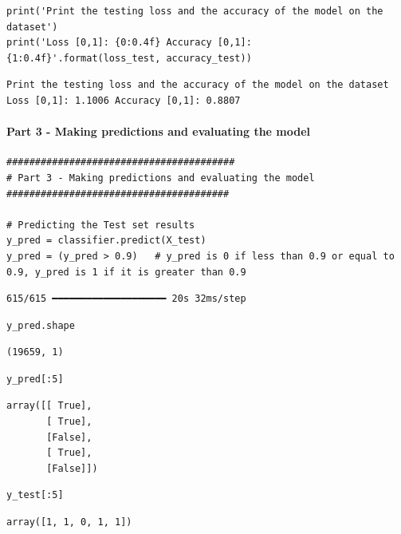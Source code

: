 \begin{verbatim}
print('Print the testing loss and the accuracy of the model on the dataset')
print('Loss [0,1]: {0:0.4f} Accuracy [0,1]: {1:0.4f}'.format(loss_test, accuracy_test))
\end{verbatim}

\begin{verbatim}
Print the testing loss and the accuracy of the model on the dataset
Loss [0,1]: 1.1006 Accuracy [0,1]: 0.8807
\end{verbatim}

\paragraph{Part 3 - Making predictions and evaluating the model}

\begin{verbatim}
########################################
# Part 3 - Making predictions and evaluating the model
#######################################

# Predicting the Test set results
y_pred = classifier.predict(X_test)
y_pred = (y_pred > 0.9)   # y_pred is 0 if less than 0.9 or equal to 0.9, y_pred is 1 if it is greater than 0.9
\end{verbatim}

\begin{verbatim}
615/615 ━━━━━━━━━━━━━━━━━━━━ 20s 32ms/step
\end{verbatim}

\begin{verbatim}
y_pred.shape
\end{verbatim}

\begin{verbatim}
(19659, 1)
\end{verbatim}

\begin{verbatim}
y_pred[:5]
\end{verbatim}

\begin{verbatim}
array([[ True],
       [ True],
       [False],
       [ True],
       [False]])
\end{verbatim}

\begin{verbatim}
y_test[:5]
\end{verbatim}

\begin{verbatim}
array([1, 1, 0, 1, 1])
\end{verbatim}

